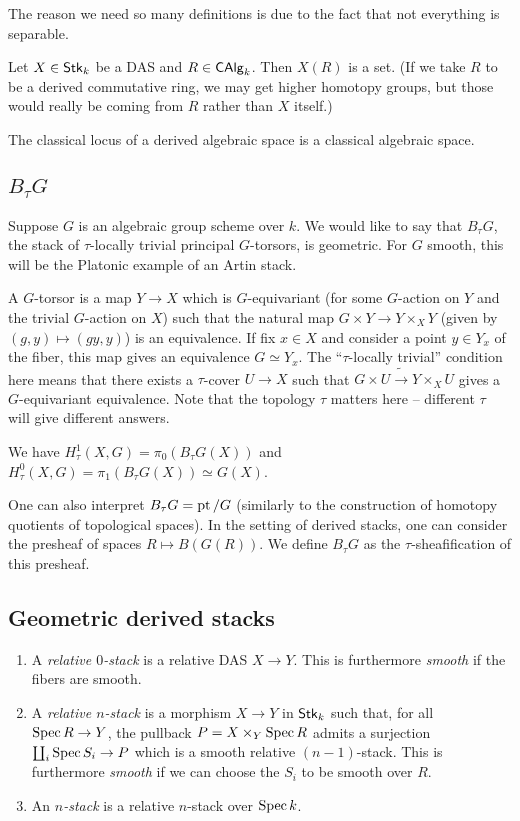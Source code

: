 \documentclass{amsart}
\begin{document}
The reason we need so many definitions is due to the fact that not everything is separable.

\begin{rmk}
	Let $X \in \mathsf{Stk}_k$ be a DAS and $R \in \mathsf{CAlg}_k$.
	Then $X(R)$ is a set.
	(If we take $R$ to be a derived commutative ring, we may get higher homotopy groups, but those would really be coming from $R$ rather than $X$ itself.)
\end{rmk}

The classical locus of a derived algebraic space is a classical algebraic space.

\subsection{$B_\tau G$}

Suppose $G$ is an algebraic group scheme over $k$.
We would like to say that $B_\tau G$, the stack of $\tau$-locally trivial principal $G$-torsors, is geometric.
For $G$ smooth, this will be the Platonic example of an Artin stack.

A $G$-torsor is a map $Y \to X$ which is $G$-equivariant (for some $G$-action on $Y$ and the trivial $G$-action on $X$) such that the natural map $G \times Y \to Y \times_X Y$ (given by $(g, y) \mapsto (gy, y)$) is an equivalence.
If fix $x \in X$ and consider a point $y \in Y_x$ of the fiber, this map gives an equivalence $G \simeq Y_x$.
The ``$\tau$-locally trivial'' condition here means that there exists a $\tau$-cover $U \to X$ such that $G \times U \tilde{\to} Y \times_X U$ gives a $G$-equivariant equivalence.
Note that the topology $\tau$ matters here -- different $\tau$ will give different answers.

We have $H^1_\tau(X, G) = \pi_0(B_\tau G(X))$ and $H^0_\tau(X, G) = \pi_1(B_\tau G(X)) \simeq G(X)$.

One can also interpret $B_\tau G = \operatorname{pt} / G$ (similarly to the construction of homotopy quotients of topological spaces).
In the setting of derived stacks, one can consider the presheaf of spaces $R \mapsto B(G(R))$.
We define $B_\tau G$ as the $\tau$-sheafification of this presheaf.

\subsection{Geometric derived stacks}

\begin{dfn}
	\begin{enumerate}
		\item A \emph{relative $0$-stack} is a relative DAS $X \to Y$.
			This is furthermore \emph{smooth} if the fibers are smooth.
		\item A \emph{relative $n$-stack} is a morphism $X \to Y$ in $\mathsf{Stk}_k$ such that, for all $\operatorname{Spec} R \to Y$, the pullback $P = X \times_Y \operatorname{Spec} R$ admits a surjection $\coprod_i \operatorname{Spec} S_i \to P$ which is a smooth relative $(n-1)$-stack.
			This is furthermore \emph{smooth} if we can choose the $S_i$ to be smooth over $R$.
		\item An \emph{$n$-stack} is a relative $n$-stack over $\operatorname{Spec} k$.
	\end{enumerate}
\end{dfn}
\end{document}
